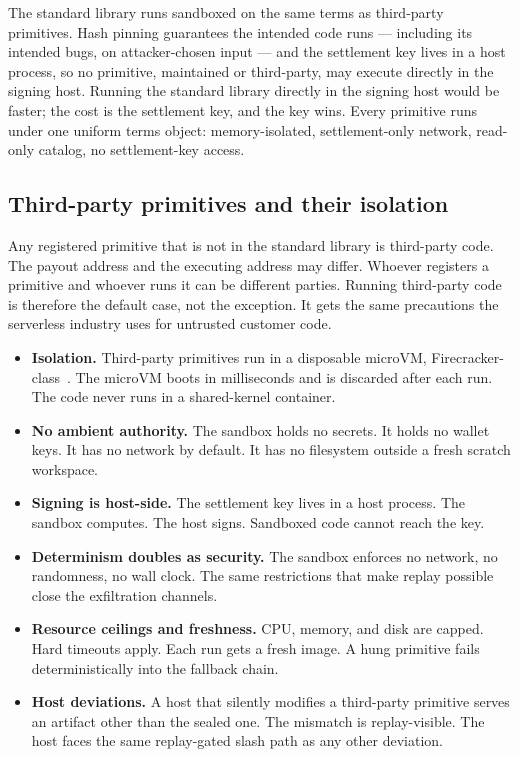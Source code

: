 \documentclass[11pt]{article}
\begin{document}
The standard library runs sandboxed on the same terms as
third-party primitives. Hash pinning guarantees the
intended code runs --- including its intended bugs, on
attacker-chosen input --- and the settlement key lives in a host
process, so no primitive, maintained or third-party, may execute
directly in the signing host. Running the standard library
directly in the signing host would be faster; the cost is the
settlement key, and the key wins. Every primitive runs under one
uniform terms object: memory-isolated, settlement-only network,
read-only catalog, no settlement-key access.

\subsection{Third-party primitives and their isolation}

Any registered primitive that is not in the standard library is
third-party code. The payout address and the executing address may
differ. Whoever registers a primitive and whoever runs it can be
different parties. Running third-party code is therefore the
default case, not the exception. It gets the same precautions the
serverless industry uses for untrusted customer code.

\begin{itemize}
\item \textbf{Isolation.} Third-party primitives run in a
disposable microVM, Firecracker-class~\cite{agache2020}. The
microVM boots in milliseconds and is discarded after each run.
The code never runs in a shared-kernel container.
\item \textbf{No ambient authority.} The sandbox holds no
secrets. It holds no wallet keys. It has no network by default.
It has no filesystem outside a fresh scratch workspace.
\item \textbf{Signing is host-side.} The settlement key lives in
a host process. The sandbox computes. The host signs. Sandboxed
code cannot reach the key.
\item \textbf{Determinism doubles as security.} The sandbox
enforces no network, no randomness, no wall clock. The same
restrictions that make replay possible close the exfiltration
channels.
\item \textbf{Resource ceilings and freshness.} CPU, memory, and
disk are capped. Hard timeouts apply. Each run gets a fresh
image. A hung primitive fails deterministically into the fallback
chain.
\item \textbf{Host deviations.} A host that silently modifies a
third-party primitive serves an artifact other than the sealed
one. The mismatch is replay-visible. The host faces the same
replay-gated slash path as any other deviation.
\end{itemize}
\end{document}
